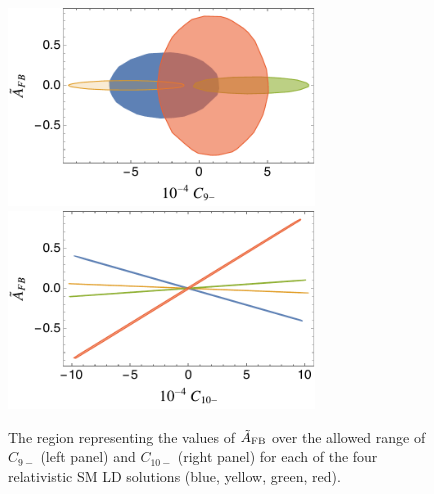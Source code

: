 \documentclass[amsmath,amssymb,aps,nofootinbib,prd,preprint,superscriptaddress,tightenlines,a4paper,bm]{revtex4-2}
\begin{document}
\begin{figure}[t]
\includegraphics[width=3.2in]{afbc9m.pdf} ~ ~ \includegraphics[width=3.2in]{afbc10m.pdf}
\caption{The region representing the values of $\tilde{A}_{\rm FB}$ over the allowed range of $C_{9-}$ (left panel) and $C_{10-}$ (right panel) for each of the four relativistic SM LD solutions (blue, yellow, green, red).}
    \label{fig:asym_NP}
\end{figure}
\end{document}
